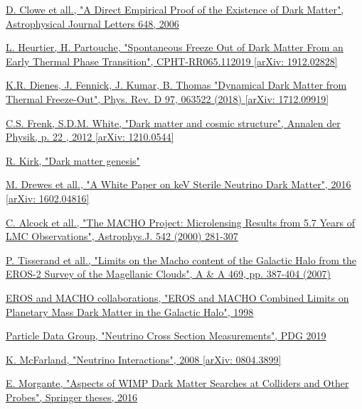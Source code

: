 \documentclass[a4paper, 10pt, openright]{report}
\begin{document}
\begin{thebibliography}{1}
\href{https://iopscience.iop.org/article/10.1086/508162}{D. Clowe et all.,
"A Direct Empirical Proof of the Existence of Dark Matter",
Astrophysical Journal Letters 648, 2006
}

\href{https://arxiv.org/abs/1912.02828}{L. Heurtier, H. Partouche,
"Spontaneous Freeze Out of Dark Matter From an Early Thermal Phase Transition",
CPHT-RR065.112019 [arXiv: 1912.02828]}

\href{https://arxiv.org/pdf/1712.09919.pdf}{K.R. Dienes, J. Fennick, J. Kumar, B. Thomas
"Dynamical Dark Matter from Thermal Freeze-Out",
Phys. Rev. D 97, 063522 (2018) [arXiv: 1712.09919]
}

\href{https://arxiv.org/pdf/1210.0544.pdf}{C.S. Frenk, S.D.M. White,
"Dark matter and cosmic structure",
Annalen der Physik, p. 22 , 2012 [arXiv: 1210.0544]
}

\href{http://inspirehep.net/record/1683379/files/fulltext.pdf}{R. Kirk,
"Dark matter genesis"}

\href{https://arxiv.org/pdf/1602.04816.pdf}{M. Drewes et all.,
"A White Paper on keV Sterile Neutrino Dark Matter",
2016 [arXiv: 1602.04816]
}

\href{https://arxiv.org/pdf/astro-ph/0001272}{C. Alcock et all.,
"The MACHO Project: Microlensing Results from 5.7 Years of LMC Observations",
	Astrophys.J. 542 (2000) 281-307
}

\href{https://www.aanda.org/articles/aa/pdf/2007/26/aa6017-06.pdf}{P. Tisserand et all.,
"Limits on the Macho content of the Galactic Halo from the EROS-2 Survey of the Magellanic Clouds",
A \& A 469, pp. 387-404 (2007)
}

\href{https://arxiv.org/abs/astro-ph/9803082}{EROS and MACHO collaborations,
"EROS and MACHO Combined Limits on Planetary Mass Dark Matter in the Galactic Halo",
1998
}

\href{http://pdg.lbl.gov/2019/reviews/rpp2018-rev-nu-cross-sections.pdf}{Particle Data Group,
"Neutrino Cross Section Measurements",
PDG 2019
}

\href{https://arxiv.org/pdf/0804.3899.pdf}{K. McFarland,
"Neutrino Interactions",
2008 [arXiv: 0804.3899]
}

\href{http://inspirehep.net/record/1510610}{E. Morgante,
"Aspects of WIMP Dark Matter Searches at Colliders and Other Probes",
Springer theses, 2016
}


\end{thebibliography}
\end{document}
